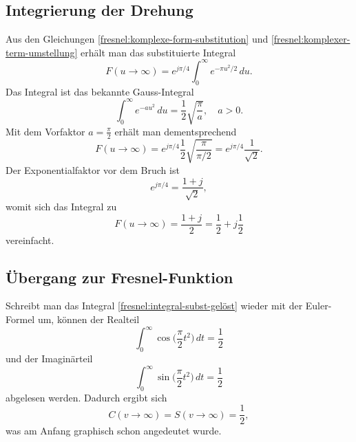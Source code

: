 

\subsection{Integrierung der Drehung}
Aus den Gleichungen \eqref{fresnel:komplexe-form-substitution} 
und \eqref{fresnel:komplexer-term-umstellung} erhält man das substituierte Integral
\[
F(u \to \infty)
=
e^{j \pi / 4}
\int_{0}^{\infty} e^{-\pi u^2 / 2} \,du.
\]
Das Integral ist das bekannte Gauss-Integral
\begin{equation}
    \int_{0}^{\infty} e^{-au^2} \,du 
    =
    \frac{1}{2}
    \sqrt{\dfrac{\pi}{a}},
    \quad
    a > 0.
    \label{fresnel:gauss-integral}
\end{equation}
Mit dem Vorfaktor $a=\frac{\pi}{2}$ erhält man dementsprechend
\[
F(u \to \infty)
=
e^{j \pi / 4}
\frac{1}{2}
\sqrt{\dfrac{\pi}{\pi / 2}}
=
e^{j \pi / 4}\frac{1}{\sqrt{2}}.
\]
Der Exponentialfaktor vor dem Bruch ist 
\[
e^{j \pi / 4}
=
\dfrac{1 + j}{\sqrt{2}},
\]
womit sich das Integral zu
\begin{equation}
    F(u \to \infty)
    =
    \frac{1 + j}{2}
    =
    \frac{1}{2} + j\frac{1}{2}
    \label{fresnel:integral-subst-gelöst}
\end{equation}
vereinfacht.

\subsection{Übergang zur Fresnel-Funktion}
Schreibt man das Integral \eqref{fresnel:integral-subst-gelöst} wieder mit der Euler-Formel um,
können der Realteil
\[
\int_{0}^{\infty} \cos \biggl(\frac{\pi}{2}t^2\biggr)\, dt
=
\frac{1}{2}
\]
und der Imaginärteil
\[
\int_{0}^{\infty} \sin \biggl(\frac{\pi}{2}t^2\biggr)\, dt
=
\frac{1}{2}
\]
abgelesen werden.
Dadurch ergibt sich
\[
C(v \to \infty) = S(v \to \infty) = \dfrac{1}{2},
\]
was am Anfang graphisch schon angedeutet wurde.
